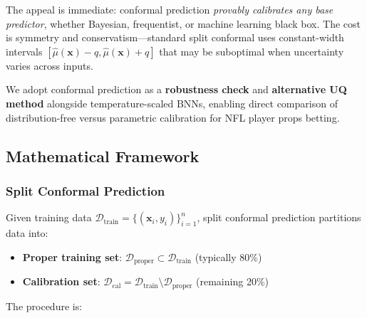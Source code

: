The appeal is immediate: conformal prediction \textit{provably calibrates any base predictor}, whether Bayesian, frequentist, or machine learning black box. The cost is symmetry and conservatism—standard split conformal uses constant-width intervals $[\hat{\mu}(\mathbf{x}) - q, \hat{\mu}(\mathbf{x}) + q]$ that may be suboptimal when uncertainty varies across inputs.

We adopt conformal prediction as a \textbf{robustness check} and \textbf{alternative UQ method} alongside temperature-scaled BNNs, enabling direct comparison of distribution-free versus parametric calibration for NFL player props betting.

\subsection{Mathematical Framework}\label{subsec:conformal-math}

\subsubsection{Split Conformal Prediction}

Given training data $\mathcal{D}_{\text{train}} = \{(\mathbf{x}_i, y_i)\}_{i=1}^n$, split conformal prediction partitions data into:

\begin{itemize}
    \item \textbf{Proper training set}: $\mathcal{D}_{\text{proper}} \subset \mathcal{D}_{\text{train}}$ (typically 80\%)
    \item \textbf{Calibration set}: $\mathcal{D}_{\text{cal}} = \mathcal{D}_{\text{train}} \setminus \mathcal{D}_{\text{proper}}$ (remaining 20\%)
\end{itemize}

The procedure is:

